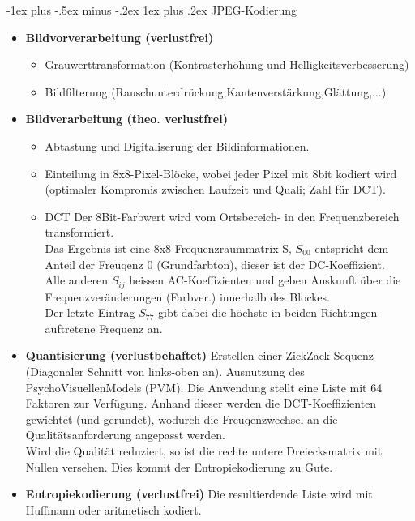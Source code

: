 \documentclass[10pt,landscape]{article}
\makeatletter
\renewcommand{\subsubsection}{\@startsection{subsubsection}{3}{0mm}%
                                {-1ex plus -.5ex minus -.2ex}%
                                {1ex plus .2ex}%
                                {\normalfont\small\bfseries}}
\makeatother
\begin{document}
\begin{multicols}{3}
\subsubsection{JPEG-Kodierung}
\begin{itemize}
    \item \textbf{Bildvorverarbeitung (verlustfrei)}
        \begin{itemize}
            \item Grauwerttransformation (Kontrasterh\"ohung und Helligkeitsverbesserung)
            \item Bildfilterung (Rauschunterdr\"uckung,Kantenverst\"arkung,Gl\"attung,...)
        \end{itemize}
    \item \textbf{Bildverarbeitung (theo. verlustfrei)}
    \begin{itemize}
        \item Abtastung und Digitaliserung der Bildinformationen.
        \item Einteilung in 8x8-Pixel-Bl\"ocke, wobei jeder Pixel mit 8bit kodiert wird (optimaler Kompromis zwischen Laufzeit und Quali; Zahl f\"ur DCT).
        \item DCT Der 8Bit-Farbwert wird vom Ortsbereich- in den Frequenzbereich transformiert. \\
            Das Ergebnis ist eine 8x8-Frequenzraummatrix S, $S_{00}$ entspricht dem Anteil der Freuqenz 0 (Grundfarbton), dieser ist der DC-Koeffizient.\\
            Alle anderen $S_{ij}$ heissen AC-Koeffizienten und geben Auskunft \"uber die Frequenzver\"anderungen (Farbver.) innerhalb des Blockes.\\
            Der letzte Eintrag $S_{77}$ gibt dabei die h\"ochste in beiden Richtungen auftretene Frequenz an.
    \end{itemize}
    \item \textbf{Quantisierung (verlustbehaftet)} Erstellen einer ZickZack-Sequenz (Diagonaler Schnitt von links-oben an). Ausnutzung des PsychoVisuellenModels (PVM).
        Die Anwendung stellt eine Liste mit 64 Faktoren zur Verf\"ugung. Anhand dieser werden die DCT-Koeffizienten gewichtet (und gerundet),
        wodurch die Freuqenzwechsel an die Qualit\"atsanforderung angepasst werden.\\
        Wird die Qualit\"at reduziert, so ist die rechte untere Dreiecksmatrix mit Nullen versehen. Dies kommt der Entropiekodierung zu Gute.
    \item \textbf{Entropiekodierung (verlustfrei)} Die resultierdende Liste wird mit Huffmann oder aritmetisch kodiert.    
\end{itemize}

\end{multicols}
\end{document}
